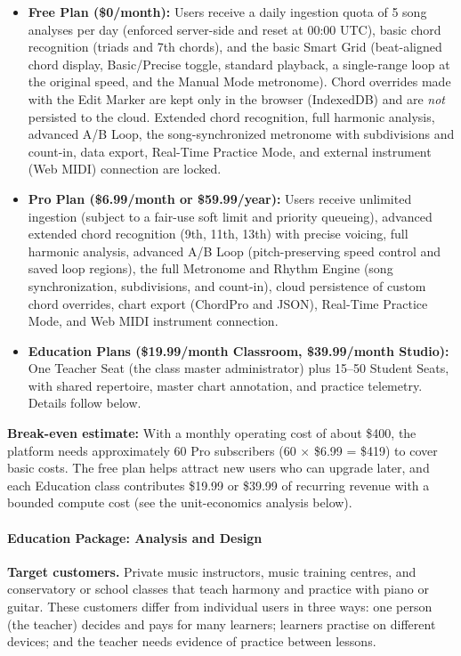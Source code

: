 \documentclass[a4paper]{article}
\begin{document}
\begin{itemize}
    \item \textbf{Free Plan (\$0/month):} Users receive a daily ingestion quota of 5 song analyses per day (enforced server-side and reset at 00:00 UTC), basic chord recognition (triads and 7th chords), and the basic Smart Grid (beat-aligned chord display, Basic/Precise toggle, standard playback, a single-range loop at the original speed, and the Manual Mode metronome). Chord overrides made with the Edit Marker are kept only in the browser (IndexedDB) and are \emph{not} persisted to the cloud. Extended chord recognition, full harmonic analysis, advanced A/B Loop, the song-synchronized metronome with subdivisions and count-in, data export, Real-Time Practice Mode, and external instrument (Web MIDI) connection are locked.
    \item \textbf{Pro Plan (\$6.99/month or \$59.99/year):} Users receive unlimited ingestion (subject to a fair-use soft limit and priority queueing), advanced extended chord recognition (9th, 11th, 13th) with precise voicing, full harmonic analysis, advanced A/B Loop (pitch-preserving speed control and saved loop regions), the full Metronome and Rhythm Engine (song synchronization, subdivisions, and count-in), cloud persistence of custom chord overrides, chart export (ChordPro and JSON), Real-Time Practice Mode, and Web MIDI instrument connection.
    \item \textbf{Education Plans (\$19.99/month Classroom, \$39.99/month Studio):} One Teacher Seat (the class master administrator) plus 15--50 Student Seats, with shared repertoire, master chart annotation, and practice telemetry. Details follow below.
\end{itemize}

\textbf{Break-even estimate:} With a monthly operating cost of about \$400, the platform needs approximately 60 Pro subscribers (60 $\times$ \$6.99 = \$419) to cover basic costs. The free plan helps attract new users who can upgrade later, and each Education class contributes \$19.99 or \$39.99 of recurring revenue with a bounded compute cost (see the unit-economics analysis below).

\paragraph{Education Package: Analysis and Design}

\textbf{Target customers.} Private music instructors, music training centres, and conservatory or school classes that teach harmony and practice with piano or guitar. These customers differ from individual users in three ways: one person (the teacher) decides and pays for many learners; learners practise on different devices; and the teacher needs evidence of practice between lessons.
\end{document}
